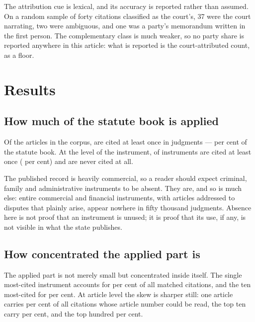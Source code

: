 \documentclass[11pt]{article}
\begin{document}
The attribution cue is lexical, and its accuracy is reported rather than
assumed. On a random sample of forty citations classified as the court's, 37
were the court narrating, two were ambiguous, and one was a party's
memorandum written in the first person. The complementary class is much
weaker, so no party share is reported anywhere in this article: what is
reported is the court-attributed count, as a floor.

\section{Results}
\label{sec:results}

\subsection{How much of the statute book is applied}

Of the \nRegistryArticles{} articles in the corpus, \nArticlesCited{} are
cited at least once in \nJudgments{} judgments --- \nArticlesCitedShare{} per
cent of the statute book. At the level of the instrument, \nInstrumentsCited{} of
\nInstruments{} instruments are cited at least once
(\nInstrumentsCitedShare{} per cent) and \nInstrumentsNever{} are never cited
at all.

The published record is heavily commercial, so a reader should expect
criminal, family and administrative instruments to be absent. They are, and
so is much else: entire commercial and financial instruments, with articles
addressed to disputes that plainly arise, appear nowhere in fifty thousand
judgments. Absence here is not proof that an instrument is unused; it is proof
that its use, if any, is not visible in what the state publishes.

\subsection{How concentrated the applied part is}

The applied part is not merely small but concentrated inside itself. The
single most-cited instrument accounts for \nTopOneShare{} per cent of all
matched citations, and the ten most-cited for \nTopTenShare{} per cent. At
article level the skew is sharper still: one article carries
\nArtTopOneShare{} per cent of all citations whose article number could be
read, the top ten carry \nArtTopTenShare{} per cent, and the top hundred
\nArtTopHundredShare{} per cent.
\end{document}
